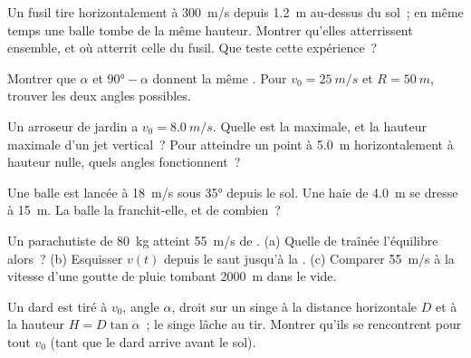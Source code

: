 \begin{exercise}[$\star\star$]\label{exo:g12:projectile-motion:10}
Un fusil tire horizontalement à \qty{300}{m/s} depuis \qty{1.2}{m}
au-dessus du sol~; en même temps une balle tombe de la même hauteur.
Montrer qu'elles atterrissent ensemble, et où atterrit celle du fusil.
Que teste cette expérience~?
\end{exercise}

\begin{exercise}[$\star\star$]\label{exo:g12:projectile-motion:11}
Montrer que $\alpha$ et $\ang{90}-\alpha$ donnent la même
. Pour $v_0 = \qty{25}{m/s}$ et
$R = \qty{50}{m}$, trouver les deux angles possibles.
\end{exercise}

\begin{exercise}[$\star\star\star$]\label{exo:g12:projectile-motion:12}
Un arroseur de jardin a $v_0 = \qty{8.0}{m/s}$. Quelle est la
 maximale, et la hauteur maximale d'un jet
vertical~? Pour atteindre un point à \qty{5.0}{m} horizontalement à
hauteur nulle, quels angles fonctionnent~?
\end{exercise}

\begin{exercise}[$\star\star\star$]\label{exo:g12:projectile-motion:13}
Une balle est lancée à \qty{18}{m/s} sous \ang{35} depuis le sol.
Une haie de \qty{4.0}{m} se dresse à \qty{15}{m}. La balle la
franchit-elle, et de combien~?
\end{exercise}

\begin{exercise}[$\star\star\star$]\label{exo:g12:projectile-motion:14}
Un parachutiste de \qty{80}{kg} atteint \qty{55}{m/s} de
. (a) Quelle  de traînée
l'équilibre alors~? (b) Esquisser $v(t)$ depuis le saut jusqu'à la
. (c) Comparer \qty{55}{m/s} à la vitesse d'une goutte de
pluie tombant \qty{2000}{m} dans le vide.
\end{exercise}

\begin{exercise}[$\star\star\star$]\label{exo:g12:projectile-motion:15}
Un dard est tiré à $v_0$, angle $\alpha$, droit sur un singe à la
distance horizontale $D$ et à la hauteur $H = D\tan\alpha$~; le singe
lâche au tir. Montrer qu'ils se rencontrent pour tout $v_0$ (tant que
le dard arrive avant le sol).
\end{exercise}



